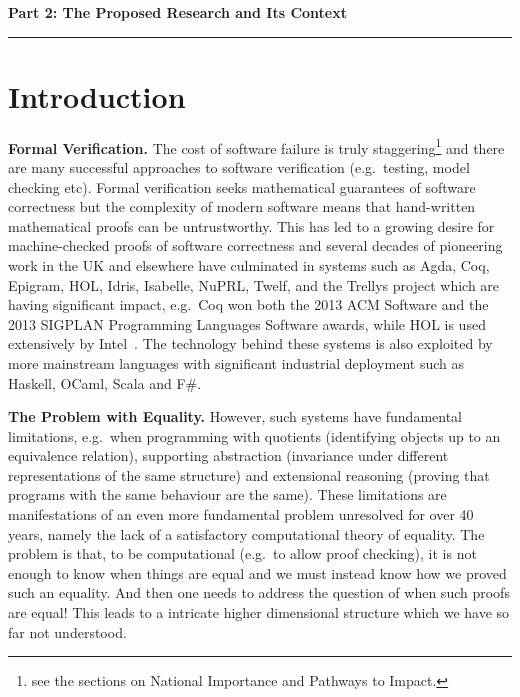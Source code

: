\documentclass[a4paper,11pt]{article}
\newcommand{\eg}{{e.g.}\ }
\begin{document}
\newpage
\noindent
{\bf \Large Part 2: The Proposed Research and Its Context}

\vspace*{-0.23in}

\begin{center}
\rule{170mm}{.5mm}
\end{center}

\vspace*{-0.4in}

\section{Introduction}\label{sec:intro}

\vspace*{-0.1in}

{\bf Formal Verification.} The cost of software failure is truly
staggering\footnote{see the sections on National Importance and
  Pathways to Impact.} and there are many successful approaches to
software verification (\eg testing, model checking etc). Formal
verification seeks mathematical guarantees of software correctness but
the complexity of modern software means that hand-written mathematical
proofs can be untrustworthy. This has led to a growing desire for
machine-checked proofs of software correctness and several decades of
pioneering work in the UK and elsewhere have culminated in systems
such as Agda, Coq, Epigram, HOL, Idris, Isabelle, NuPRL, Twelf, and
the Trellys project which are having significant impact, \eg Coq won
both the 2013 ACM Software and the 2013 SIGPLAN Programming Languages
Software awards, while HOL is used extensively by
Intel~\cite{harrison:sfm}. The technology behind these systems is also
exploited by more mainstream languages with significant industrial
deployment such as Haskell, OCaml, Scala and F\#.


{\bf The Problem with Equality.} However, such systems have
fundamental limitations, \eg when programming with quotients
(identifying objects up to an equivalence relation), supporting
abstraction (invariance under different representations of the same
structure) and extensional reasoning (proving that programs with the
same behaviour are the same). These limitations are manifestations of
an even more fundamental problem unresolved for over 40 years, namely
the lack of a satisfactory computational theory of equality. The
problem is that, to be computational (\eg to allow proof checking), it
is not enough to know when things are equal and we must instead know
how we proved such an equality. And then one needs to address the
question of when such proofs are equal! This leads to a intricate
higher dimensional structure which we have so far not understood.
\end{document}
